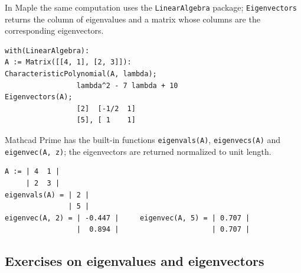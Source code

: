 In Maple the same computation uses the \texttt{LinearAlgebra} package;
\texttt{Eigenvectors} returns the column of eigenvalues and a matrix
whose columns are the corresponding eigenvectors.
\begin{Verbatim}[fontsize=\footnotesize,frame=single,label={\small Maple}]
with(LinearAlgebra):
A := Matrix([[4, 1], [2, 3]]):
CharacteristicPolynomial(A, lambda);
                 lambda^2 - 7 lambda + 10
Eigenvectors(A);
                 [2]  [-1/2  1]
                 [5], [ 1    1]
\end{Verbatim}

Mathcad Prime has the built-in functions \texttt{eigenvals(A)},
\texttt{eigenvecs(A)} and \texttt{eigenvec(A, z)}; the eigenvectors are
returned normalized to unit length.
\begin{Verbatim}[fontsize=\footnotesize,frame=single,label={\small Mathcad}]
A := | 4  1 |
     | 2  3 |
eigenvals(A) = | 2 |
               | 5 |
eigenvec(A, 2) = | -0.447 |     eigenvec(A, 5) = | 0.707 |
                 |  0.894 |                      | 0.707 |
\end{Verbatim}

\subsection{Exercises on eigenvalues and eigenvectors}

